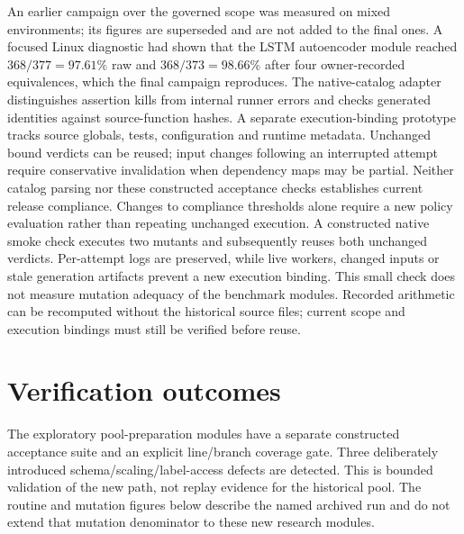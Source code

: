 \documentclass[conference]{IEEEtran}
\begin{document}
An earlier campaign over the governed scope was measured on mixed environments; its figures are superseded and
are not added to the final ones. A focused Linux diagnostic had shown that the LSTM autoencoder module reached
$368/377 = 97.61\%$ raw and $368/373 = 98.66\%$ after four owner-recorded equivalences, which the final campaign
reproduces.
The native-catalog adapter distinguishes assertion kills from internal runner
errors and checks generated identities against source-function hashes. A separate
execution-binding prototype tracks source globals, tests, configuration and
runtime metadata. Unchanged bound verdicts can be reused; input changes following
an interrupted attempt require conservative invalidation when dependency maps
may be partial. Neither catalog parsing nor these constructed acceptance checks
establishes current release compliance. Changes to compliance thresholds alone
require a new policy evaluation rather than repeating unchanged execution.
A constructed native smoke check executes two mutants and subsequently reuses
both unchanged verdicts. Per-attempt logs are preserved, while live workers,
changed inputs or stale generation artifacts prevent a new execution binding.
This small check does not measure mutation adequacy of the benchmark modules.
Recorded arithmetic can be recomputed without the historical source files;
current scope and execution bindings must still be verified before reuse.

\section{Verification outcomes}
\label{app:outcomes}
The exploratory pool-preparation modules have a separate constructed acceptance
suite and an explicit line/branch coverage gate. Three deliberately introduced
schema/scaling/label-access defects are detected. This is bounded
validation of the new path, not replay evidence for the historical pool. The
routine and mutation figures below describe the named archived run and do not
extend that mutation denominator to these new research modules.
\end{document}
